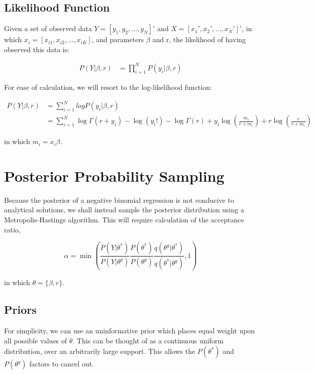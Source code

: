 \documentclass[12pt]{article}
\begin{document}
	\subsection{Likelihood Function}
	Given a set of observed data $Y = [y_1, y_2, \dots, y_N]'$ and $X = [x_1', x_2', \dots, x_N']'$, in which $x_i = [x_{i1}, x_{i2}, \dots, x_{iK}]$, and parameters $\beta$ and r, the likelihood of having observed this data is:
	
	\begin{align}
	P(Y|\beta, r) &= \prod_{i = 1}^{N} P(y_i|\beta, r)
	\end{align}
	
	\pagebreak
	For ease of calculation, we will resort to the log-likelihood function:
	
	\begin{align}
	P(Y|\beta, r) &= \sum_{i = 1}^{N} log P(y_i|\beta, r)\\
	&= \sum_{i = 1}^{N} \log \Gamma(r + y_i) - \log(y_i!) - \log \Gamma(r) + y_i \log(\frac{m_i}{r + m_i}) + r \log(\frac{r}{r + m_i})
	\end{align}
	
	in which $m_i = x_i \beta$.
	
	\section{Posterior Probability Sampling}
	Because the posterior of a negative binomial regression is not conducive to analytical solutions, we shall instead sample the posterior distribution using a Metropolis-Hastings algorithm. This will require calculation of the acceptance ratio, 
	
	\begin{equation}
	\alpha = \min\left( \frac{P(Y|\theta^*)}{P(Y|\theta^g)}\frac{P(\theta^*)}{P(\theta^g)}\frac{q(\theta^g|\theta^*)}{q(\theta^*|\theta^g)}, 1\right)
	\end{equation}
	
	in which $\theta = \{\beta, r\}$.
	
	\subsection{Priors}
	For simplicity, we can use an uninformative prior which places equal weight upon all possible values of $\theta$. This can be thought of as a continuous uniform distribution, over an arbitrarily large support. This allows the $P(\theta^*)$ and $P(\theta^g)$ factors to cancel out. 
	
\end{document}
